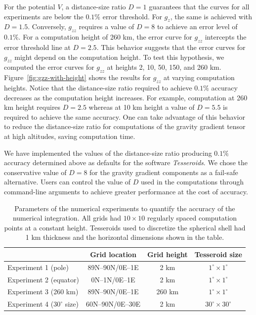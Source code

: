\documentclass[manuscript,endfloat]{geophysics}
\begin{document}
For the potential $V$, a distance-size ratio $D=1$ guarantees that the curves
for all experiments are below the $0.1\%$ error threshold.
For $g_z$, the same is achieved with $D=1.5$.
Conversely, $g_{zz}$ requires a value of $D=8$ to achieve an error level of
$0.1\%$.
For a computation height of 260 km, the error curve for $g_{zz}$
intercepts the error threshold line at $D=2.5$.
This behavior suggests that the error curves for $g_{zz}$ might depend on the
computation height.
To test this hypothesis, we computed the error curves for $g_{zz}$ at
heights 2, 10, 50, 150, and 260 km.
Figure~\ref{fig:gzz-with-height} shows the results for $g_{zz}$ at varying
computation heights.
Notice that the distance-size ratio required to achieve $0.1\%$ accuracy
decreases as the computation height increases.
For example, computation at 260 km height requires $D=2.5$ whereas at 10 km
height a value of $D=5.5$ is required to achieve the same accuracy.
One can take advantage of this behavior to reduce the distance-size ratio for
computations of the gravity gradient tensor at high altitudes,
saving computation time.


We have implemented the values of the distance-size ratio producing $0.1\%$
accuracy determined above as defaults for the software \emph{Tesseroids}.
We chose the conservative value of $D=8$ for the gravity gradient components
as a fail-safe alternative.
Users can control the value of $D$ used in the computations through
command-line arguments to achieve greater performance at the cost of
accuracy.


\begin{table}
\centering
\begin{tabular}{lccc}
    \hline
    ~             & Grid location & Grid height & Tesseroid size \\
    \hline
    Experiment 1 (pole)            & 89N--90N/0E--1E  & 2 km   & $1^\circ \times 1^\circ$ \\
    Experiment 2 (equator)         & 0N--1N/0E--1E    & 2 km   & $1^\circ \times 1^\circ$ \\
    Experiment 3 (260 km)          & 89N--90N/0E--1E  & 260 km & $1^\circ \times 1^\circ$ \\
    Experiment 4 ($30^\circ$ size) & 60N--90N/0E--30E & 2 km   & $30^\circ \times 30^\circ$ \\
    \hline
\end{tabular}
\caption{
    Parameters of the numerical experiments to quantify the accuracy of
    the numerical integration.
    All grids had $10\times10$ regularly spaced computation points at a
    constant height.
    Tesseroids used to discretize the spherical shell had 1 km thickness and
    the horizontal dimensions shown in the table.
}
\label{tbl:experiment}
\end{table}
\end{document}
